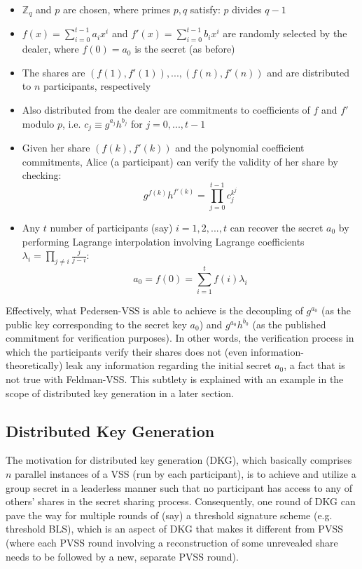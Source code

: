 \documentclass[11pt]{article}
\theoremstyle{definition}
\theoremstyle{remark}
\begin{document}
\begin{itemize}
\item $\mathbb{Z}_q$ and $p$ are chosen, where primes $p, q$ satisfy: $p$ divides $q - 1$
\item $f(x) = \sum_{i = 0}^{t - 1} a_i x^i$ and $f'(x) = \sum_{i = 0}^{t - 1} b_i x^i$ are randomly selected by the dealer, where $f(0) = a_0$ is the secret (as before)
\item The shares are $(f(1), f'(1)), ..., (f(n), f'(n))$ and are distributed to $n$ participants, respectively
\item Also distributed from the dealer are commitments to coefficients of $f$ and $f'$ modulo $p$, i.e. $c_j \equiv g^{a_j} h^{b_j}$ for $j = 0, ..., t - 1$
\item Given her share $(f(k), f'(k))$ and the polynomial coefficient commitments, Alice (a participant) can verify the validity of her share by checking:
$$g^{f(k)} h^{f'(k)} = \prod_{j = 0}^{t - 1} c_j^{k^j}$$
\item Any $t$ number of participants (say) $i = 1, 2, ..., t$ can recover the secret $a_0$ by performing Lagrange interpolation involving Lagrange coefficients $\lambda_i = \prod_{j \neq i} \frac{j}{j - i}$:
$$a_0 = f(0) = \sum_{i = 1}^{t} f(i) \lambda_i$$
\end{itemize}

Effectively, what Pedersen-VSS is able to achieve is the decoupling of $g^{a_0}$ (as the public key corresponding to the secret key $a_0$) and $g^{a_0} h^{b_0}$ (as the published commitment for verification purposes). In other words, the verification process in which the participants verify their shares does not (even information-theoretically) leak any information regarding the initial secret $a_0$, a fact that is not true with Feldman-VSS. This subtlety is explained with an example in the scope of distributed key generation in a later section.

\subsection{Distributed Key Generation}
The motivation for distributed key generation (DKG), which basically comprises $n$ parallel instances of a VSS (run by each participant), is to achieve and utilize a group secret in a leaderless manner such that no participant has access to any of others' shares in the secret sharing process. Consequently, one round of DKG can pave the way for multiple rounds of (say) a threshold signature scheme (e.g. threshold BLS), which is an aspect of DKG that makes it different from PVSS (where each PVSS round involving a reconstruction of some unrevealed share needs to be followed by a new, separate PVSS round).
\end{document}
